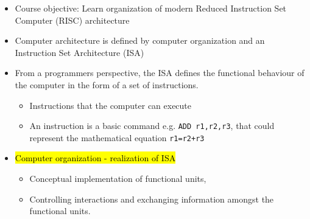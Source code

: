 \begin{frame}[fragile]
\begin{itemize}
	\item Course objective: Learn organization of modern Reduced Instruction Set Computer (RISC) architecture 
  \item  Computer architecture is defined by computer organization and an Instruction Set Architecture (ISA)
  \item From a programmers perspective, the ISA  defines the functional behaviour 
                of the computer in the form of a set of instructions. 
		\begin{itemize}
                \item Instructions that the computer can execute
                 \item An instruction is a basic command	e.g. \texttt{ADD r1,r2,r3}, that could represent the mathematical equation \texttt{r1=r2+r3}
		\end{itemize}
	\item \hl{Computer organization - realization of ISA} 
\begin{itemize}
    \item Conceptual implementation of functional units,
    \item Controlling interactions and exchanging information amongst the functional units.  
\end{itemize}	

\end{itemize}
\end{frame}

